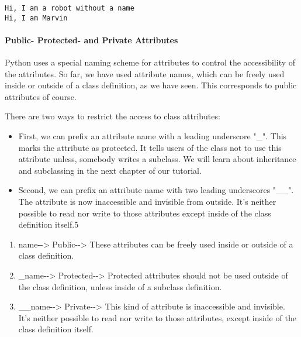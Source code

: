 \documentclass[11pt]{article}
\begin{document}
    \begin{Verbatim}[commandchars=\\\{\}]
Hi, I am a robot without a name
Hi, I am Marvin

    \end{Verbatim}

    \paragraph{Public- Protected- and Private
Attributes}\label{public--protected--and-private-attributes}

Python uses a special naming scheme for attributes to control the
accessibility of the attributes. So far, we have used attribute names,
which can be freely used inside or outside of a class definition, as we
have seen. This corresponds to public attributes of course.

There are two ways to restrict the access to class attributes:

\begin{itemize}
\item
  First, we can prefix an attribute name with a leading underscore "\_".
  This marks the attribute as protected. It tells users of the class not
  to use this attribute unless, somebody writes a subclass. We will
  learn about inheritance and subclassing in the next chapter of our
  tutorial.
\item
  Second, we can prefix an attribute name with two leading underscores
  "\_\_". The attribute is now inaccessible and invisible from outside.
  It's neither possible to read nor write to those attributes except
  inside of the class definition itself.5
\end{itemize}

\begin{enumerate}
\def\labelenumi{\arabic{enumi})}
\item
  name-\/-\textgreater{} Public-\/-\textgreater{} These attributes can
  be freely used inside or outside of a class definition.
\item
  \_name-\/-\textgreater{} Protected-\/-\textgreater{} Protected
  attributes should not be used outside of the class definition, unless
  inside of a subclass definition.
\item
  \_\_name-\/-\textgreater{} Private-\/-\textgreater{} This kind of
  attribute is inaccessible and invisible. It's neither possible to read
  nor write to those attributes, except inside of the class definition
  itself.
\end{enumerate}
\end{document}
